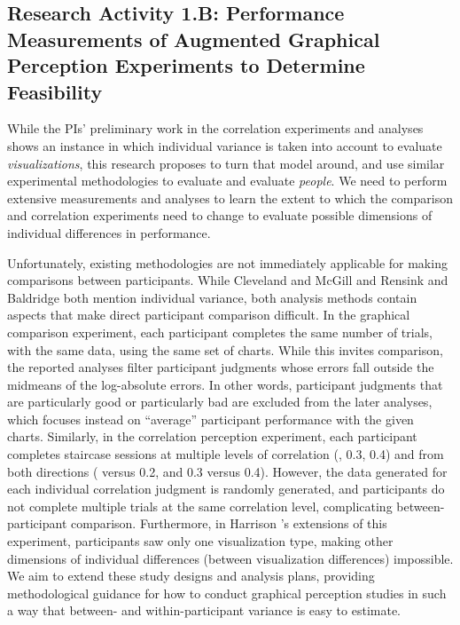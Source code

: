 \documentclass[11pt]{article}
\begin{document}
\subsection{Research Activity 1.B: Performance Measurements of Augmented Graphical Perception Experiments to Determine Feasibility}
While the PIs' preliminary work in the correlation experiments and analyses \cite{harrison2014ranking, kay2016beyond} shows an instance in which individual variance is taken into account to evaluate \emph{visualizations}, this research proposes to turn that model around, and use similar experimental methodologies to evaluate and evaluate \emph{people}.
We need to perform extensive measurements and analyses to learn the extent to which the comparison and correlation experiments need to change to evaluate possible dimensions of individual differences in performance.

Unfortunately, existing methodologies are not immediately applicable for making comparisons between participants.
While Cleveland and McGill \cite{cleveland1984graphical} and Rensink and Baldridge \cite{rensink2010perception} both mention individual variance, both analysis methods contain aspects that make direct participant comparison difficult.
In the graphical comparison experiment, each participant completes the same number of trials, with the same data, using the same set of charts. While this invites comparison, the reported analyses filter participant judgments whose errors fall outside the midmeans of the log-absolute errors.
In other words, participant judgments that are particularly good or particularly bad are excluded from the later analyses, which focuses instead on ``average'' participant performance with the given charts.
Similarly, in the correlation perception experiment, each participant completes staircase sessions at multiple levels of correlation (, 0.3, 0.4) and from both directions ( versus 0.2, and 0.3 versus 0.4).
However, the data generated for each individual correlation judgment is randomly generated, and participants do not complete multiple trials at the same correlation level, complicating between-participant comparison.
Furthermore, in Harrison \etal's extensions of this experiment, participants saw only one visualization type, making other dimensions of individual differences (\ie between visualization differences) impossible.
We aim to extend these study designs and analysis plans, providing methodological guidance for how to conduct graphical perception studies in such a way that between- and within-participant variance is easy to estimate.
\end{document}
